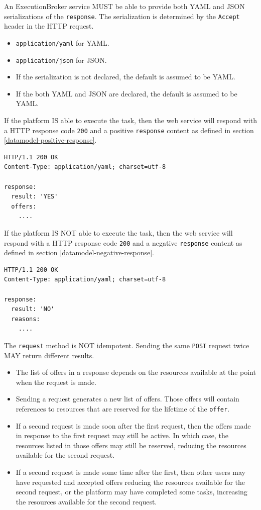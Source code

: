 \documentclass[11pt,a4paper]{ivoa}
\newcommand{\json} {JSON}
\newcommand{\yaml} {YAML}
\newcommand{\webservice} {web service}
\newcommand{\execbrokerclass} {ExecutionBroker}
\newcommand{\codeword}[1] {\texttt{#1}}
\begin{document}
An \execbrokerclass{} service MUST be able to provide both \yaml{} and \json{} serializations
of the \codeword{response}.
The serialization is determined by the \codeword{Accept} header in the HTTP request.
\begin{itemize}
    \item \codeword{application/yaml} for \yaml{}.
    \item \codeword{application/json} for \json.
    \item If the serialization is not declared, the default is assumed to be \yaml{}.
    \item If the both \yaml{} and \json{} are declared, the default is assumed to be \yaml{}.
\end{itemize}

If the platform IS able to execute the task, then the \webservice{} will respond with a
HTTP response code \codeword{200} and a positive \codeword{response} content as defined
in section \ref{datamodel-positive-response}.

\begin{lstlisting}[]
HTTP/1.1 200 OK
Content-Type: application/yaml; charset=utf-8

response:
  result: 'YES'
  offers:
    ....
\end{lstlisting}

If the platform IS NOT able to execute the task, then the \webservice{} will respond with a
HTTP response code \codeword{200} and a negative \codeword{response} content as defined
in section \ref{datamodel-negative-response}.

\begin{lstlisting}[]
HTTP/1.1 200 OK
Content-Type: application/yaml; charset=utf-8

response:
  result: 'NO'
  reasons:
    ....
\end{lstlisting}

The \codeword{request} method is NOT idempotent. Sending the same \codeword{POST} request
twice MAY return different results.

\begin{itemize}
    \item The list of offers in a response depends on the resources available at the point when the request is made.
    \item Sending a request generates a new list of offers.
    Those offers will contain references to resources that are reserved for the lifetime of the \codeword{offer}.
    \item If a second request is made soon after the first request,
    then the offers made in response to the first request may still be active.
    In which case, the resources listed in those offers may still be reserved,
    reducing the resources available for the second request.
    \item If a second request is made some time after the first, then
    other users may have requested and accepted offers reducing the resources available for the second request,
    or the platform may have completed some tasks, increasing the resources available for the second request.
\end{itemize}
\end{document}
